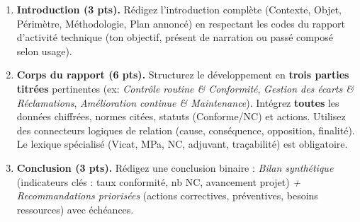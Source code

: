 \documentclass[11pt]{article}
\begin{document}
\begin{exercice}
\begin{enumerate}
    \item \textbf{Introduction (3 pts).} Rédigez l'introduction complète (Contexte, Objet, Périmètre, Méthodologie, Plan annoncé) en respectant les codes du rapport d'activité technique (ton objectif, présent de narration ou passé composé selon usage).
    \item \textbf{Corps du rapport (6 pts).} Structurez le développement en \textbf{trois parties titrées} pertinentes (ex: \textit{Contrôle routine \& Conformité}, \textit{Gestion des écarts \& Réclamations}, \textit{Amélioration continue \& Maintenance}). Intégrez \textbf{toutes} les données chiffrées, normes citées, statuts (Conforme/NC) et actions. Utilisez des connecteurs logiques de relation (cause, conséquence, opposition, finalité). Le lexique spécialisé (Vicat, MPa, NC, adjuvant, traçabilité) est obligatoire.
    \item \textbf{Conclusion (3 pts).} Rédigez une conclusion binaire : \textit{Bilan synthétique} (indicateurs clés : taux conformité, nb NC, avancement projet) \textit{+ Recommandations priorisées} (actions correctives, préventives, besoins ressources) avec échéances.
\end{enumerate}
\end{exercice}
\end{document}
